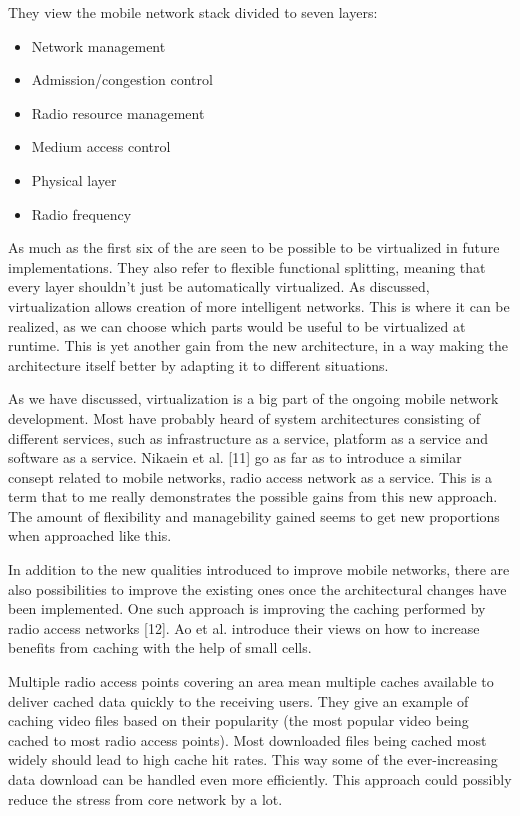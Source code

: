 \documentclass[conference]{IEEEtran}
\begin{document}
\par
They view the mobile network stack divided to seven layers:
\begin{itemize}
\item Network management
\item Admission/congestion control
\item Radio resource management
\item Medium access control
\item Physical layer
\item Radio frequency
\end{itemize}
As much as the first six of the are seen to be possible to be virtualized in future implementations. They also refer to flexible functional splitting, meaning that every layer shouldn't just be automatically virtualized. As discussed, virtualization allows creation of more intelligent networks. This is where it can be realized, as we can choose which parts would be useful to be virtualized at runtime. This is yet another gain from the new architecture, in a way making the architecture itself better by adapting it to different situations.
\par
As we have discussed, virtualization is a big part of the ongoing mobile network development. Most have probably heard of system architectures consisting of different services, such as infrastructure as a service, platform as a service and software as a service. Nikaein et al. [11] go as far as to introduce a similar consept related to mobile networks, radio access network as a service. This is a term that to me really demonstrates the possible gains from this new approach. The amount of flexibility and managebility gained seems to get new proportions when approached like this.
\par
In addition to the new qualities introduced to improve mobile networks, there are also possibilities to improve the existing ones once the architectural changes have been implemented. One such approach is improving the caching performed by radio access networks [12]. Ao et al. introduce their views on how to increase benefits from caching with the help of small cells.
\par
Multiple radio access points covering an area mean multiple caches available to deliver cached data quickly to the receiving users. They give an example of caching video files based on their popularity (the most popular video being cached to most radio access points). Most downloaded files being cached most widely should lead to high cache hit rates. This way some of the ever-increasing data download can be handled even more efficiently. This approach could possibly reduce the stress from core network by a lot.
\end{document}
